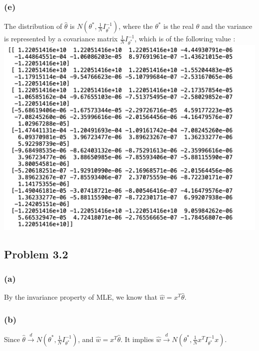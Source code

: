 \documentclass{article}
\begin{document}
\subsubsection*{(e)}
	The distribution of $\hat{\theta}$ is $N(\theta^*, \frac{1}{N}I^{-1}_{\theta^{*}})$, where the $\theta^*$ is the real $\theta$ and the variance is represented by a covariance matrix $\frac{1}{N}I^{-1}_{\theta^{*}}$, which is of the following  value :
	\includegraphics[scale=0.5]{fisher}
	
\subsection*{Problem 3.2}
\subsubsection*{(a)}
	By the invariance property of MLE, we know that  $\hat{w} = x^T\hat{\theta}$.
\subsubsection*{(b)}
	Since  $\hat{\theta}  \xrightarrow[]{d} N(\theta^*, \frac{1}{N}I^{-1}_{\theta^{*}})$, and $\hat{w} = x^T\hat{\theta}$. It implies  $\hat{w}  \xrightarrow[]{d} N(\theta^*, \frac{1}{N}x^{T}I^{-1}_{\theta^{*}}x)$.

	 
\end{document}
